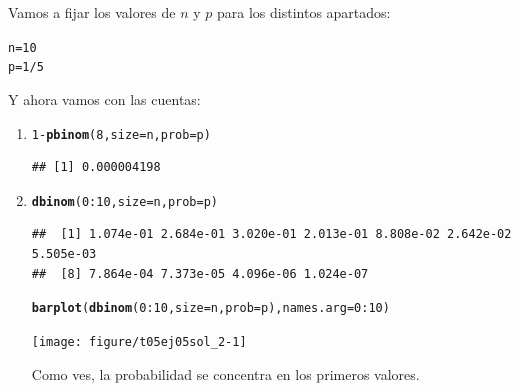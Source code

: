 \documentclass[10pt,a4paper]{article}\usepackage[]{graphicx}\usepackage[]{color}
\makeatletter
\newcommand{\hlnum}[1]{\textcolor[rgb]{0.686,0.059,0.569}{#1}}%
\newcommand{\hlopt}[1]{\textcolor[rgb]{0,0,0}{#1}}%
\newcommand{\hlstd}[1]{\textcolor[rgb]{0.345,0.345,0.345}{#1}}%
\newcommand{\hlkwb}[1]{\textcolor[rgb]{0.69,0.353,0.396}{#1}}%
\newcommand{\hlkwc}[1]{\textcolor[rgb]{0.333,0.667,0.333}{#1}}%
\newcommand{\hlkwd}[1]{\textcolor[rgb]{0.737,0.353,0.396}{\textbf{#1}}}%
\newenvironment{kframe}{%
 \def\at@end@of@kframe{}%
 \ifinner\ifhmode%
  \def\at@end@of@kframe{\end{minipage}}%
  \begin{minipage}{\columnwidth}%
 \fi\fi%
 \def\FrameCommand##1{\hskip\@totalleftmargin \hskip-\fboxsep
 \colorbox{shadecolor}{##1}\hskip-\fboxsep
     \hskip-\linewidth \hskip-\@totalleftmargin \hskip\columnwidth}%
 \MakeFramed {\advance\hsize-\width
   \@totalleftmargin\z@ \linewidth\hsize
   \@setminipage}}%
 {\par\unskip\endMakeFramed%
 \at@end@of@kframe}
\newenvironment{knitrout}{}{} %
\makeatother
\begin{document}
Vamos a fijar los valores de $n$ y $p$ para los distintos apartados:
\begin{knitrout}
\color{fgcolor}\begin{kframe}
\begin{alltt}
  \hlstd{n} \hlkwb{=} \hlnum{10}
  \hlstd{p} \hlkwb{=} \hlnum{1}\hlopt{/}\hlnum{5}
\end{alltt}
\end{kframe}
\end{knitrout}
Y ahora vamos con las cuentas:
\begin{enumerate}
  \item
\begin{knitrout}
\color{fgcolor}\begin{kframe}
\begin{alltt}
\hlnum{1}\hlopt{-}\hlkwd{pbinom}\hlstd{(}\hlnum{8}\hlstd{,} \hlkwc{size}\hlstd{=n,} \hlkwc{prob}\hlstd{=p)}
\end{alltt}
\begin{verbatim}
## [1] 0.000004198
\end{verbatim}
\end{kframe}
\end{knitrout}

  \item
\begin{knitrout}
\color{fgcolor}\begin{kframe}
\begin{alltt}
\hlkwd{dbinom}\hlstd{(}\hlnum{0}\hlopt{:}\hlnum{10}\hlstd{,} \hlkwc{size}\hlstd{=n,} \hlkwc{prob}\hlstd{=p)}
\end{alltt}
\begin{verbatim}
##  [1] 1.074e-01 2.684e-01 3.020e-01 2.013e-01 8.808e-02 2.642e-02 5.505e-03
##  [8] 7.864e-04 7.373e-05 4.096e-06 1.024e-07
\end{verbatim}
\begin{alltt}
\hlkwd{barplot}\hlstd{(}\hlkwd{dbinom}\hlstd{(}\hlnum{0}\hlopt{:}\hlnum{10}\hlstd{,} \hlkwc{size}\hlstd{=n,} \hlkwc{prob}\hlstd{=p),} \hlkwc{names.arg} \hlstd{=} \hlnum{0}\hlopt{:}\hlnum{10}\hlstd{)}
\end{alltt}
\end{kframe}
\texttt{[image: figure/t05ej05sol\_2-1]} 

\end{knitrout}
      Como ves, la probabilidad se concentra en los primeros valores.


\end{enumerate}
\end{document}
